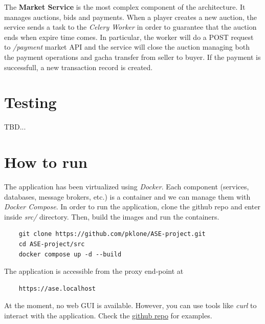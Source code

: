\documentclass{article}
\begin{document}
The \textbf{Market Service} is the most complex component of the architecture. It manages auctions, bids and payments. When a player creates a new auction, the service sends a task to the \emph{Celery Worker} in order to guarantee that the auction ends when expire time comes. In particular, the worker will do a POST request to \emph{/payment} market API and the service will close the auction managing both the payment operations and gacha transfer from seller to buyer. If the payment is successfull, a new transaction record is created.

\section{Testing}
TBD...

\newpage
\section{How to run}
The application has been virtualized using \emph{Docker}. Each component (services, databases, message brokers, etc.) is a container and we can manage them with \emph{Docker Compose}. In order to run the application, clone the github repo and enter inside \emph{src/} directory. Then, build the images and run the containers.
\begin{verbatim}
    git clone https://github.com/pklone/ASE-project.git
    cd ASE-project/src
    docker compose up -d --build
\end{verbatim}
The application is accessible from the proxy end-point at
\begin{verbatim}
    https://ase.localhost
\end{verbatim}
At the moment, no web GUI is available. However, you can use tools like \emph{curl} to interact with the application. Check the \href{https://github.com/pklone/ASE-project/test/README.md}{github repo} for examples.
\end{document}
